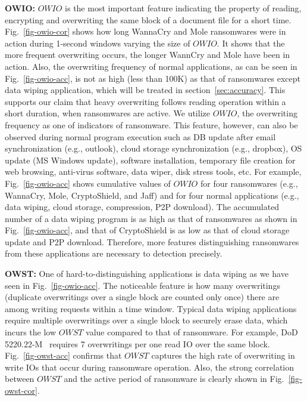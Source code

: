 \documentclass[conference]{IEEEtran}
\newcommand{\eg}{e.g.,\xspace}
\begin{document}
{\noindent\bf OWIO:} $OWIO$ is the most important feature indicating the property of reading, encrypting and overwriting 
the same block of a document file for a short time. 
Fig.~\ref{fig-owio-cor} shows how long WannaCry and Mole ransomwares were in action 
during 1-second windows varying the size of $OWIO$. 
It shows that the more frequent overwriting occurs, the longer WannCry and Mole have been in action.
Also, the overwriting frequency of normal applications, as can be seen in Fig.~\ref{fig-owio-acc}, 
is not as high (less than 100K) as that of ransomwares except data wiping application, 
which will be treated in section~\ref{sec:accuracy}.
This supports our claim that heavy overwriting follows reading operation within a short duration,
when ransomwares are active. We utilize $OWIO$, the overwriting frequency as one of indicators of ransomware.
This feature, however, can also be observed during normal program execution such as DB update
after email synchronization (\eg outlook), cloud storage synchronization (\eg dropbox),
OS update (MS Windows update), software installation, temporary file creation for web browsing,
anti-virus software, data wiper, disk stress tools, etc. For example, 
Fig.~\ref{fig-owio-acc} shows cumulative values
of $OWIO$ for four ransomwares (\eg WannaCry, Mole, CryptoShield, and Jaff) 
and for four normal applications (\eg data wiping, cloud storage, compression, P2P download).
The accumulated number of a data wiping program is 
as high as that of ransomwares as shown in Fig.~\ref{fig-owio-acc},
and that of CryptoShield is as low as that of cloud storage update and P2P download.
Therefore, more features distinguishing ransomwares from these applications are necessary
to detection precisely. 

{\noindent\bf OWST:} One of hard-to-distinguishing applications is data wiping as we have seen in Fig.~\ref{fig-owio-acc}.
The noticeable feature is how many overwritings (duplicate overwritings over a single block are counted only once) 
there are among writing requests within a time window.
Typical data wiping applications require multiple overwritings over a single block to securely erase data,
which incurs the low $OWST$ value compared to that of ransomware. For example, DoD 5220.22-M~\cite{DoD5220} requires
7 overwritings per one read IO over the same block. Fig.~\ref{fig-owst-acc} confirms 
that $OWST$ captures the high rate of overwriting in write IOs that occur during ransomware operation.
Also, the strong correlation between $OWST$ and the active period of ransomware is clearly shown in Fig.~\ref{fig-owst-cor}.
\end{document}
